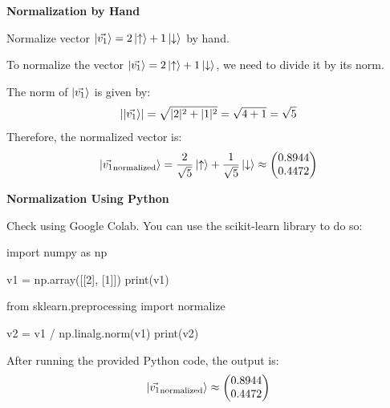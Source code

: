 \documentclass[a4paper, 10pt]{article}
\begin{document}
\subject
{}

\begin{problem}
\textbf{Normalization by Hand}
\par Normalize vector \( \ket{\vec{v_1}} = 2\ket{\uparrow} + 1\ket{\downarrow} \) by hand.
\end{problem}

\begin{solution}
	To normalize the vector \( \ket{\vec{v_1}} = 2\ket{\uparrow} + 1\ket{\downarrow} \), we need to divide it by its norm.

	The norm of \( \ket{\vec{v_1}} \) is given by:
	\[
		\left|\ket{\vec{v_1}}\right| = \sqrt{|2|^2 + |1|^2} = \sqrt{4 + 1} = \sqrt{5}
	\]
	Therefore, the normalized vector is:
	\[
		\ket{\vec{v_1}_{\text{normalized}}} = \frac{2}{\sqrt{5}} \ket{\uparrow} + \frac{1}{\sqrt{5}} \ket{\downarrow}
		\approx \begin{pmatrix}
			0.8944 \\
			0.4472
		\end{pmatrix}
	\]
\end{solution}

\begin{problem}
\textbf{Normalization Using Python}
\par Check using Google Colab. You can use the scikit-learn library to do so:
\begin{codingbox}
import numpy as np

v1 = np.array([[2], [1]])
print(v1)

from sklearn.preprocessing import normalize

v2 = v1 / np.linalg.norm(v1)
print(v2)
\end{codingbox}
\end{problem}

\begin{solution}
	After running the provided Python code, the output is:
	\[
		\ket{\vec{v_1}_{\text{normalized}}} \approx \begin{pmatrix}
			0.8944 \\
			0.4472
		\end{pmatrix}
	\]
\end{solution}
\end{document}
